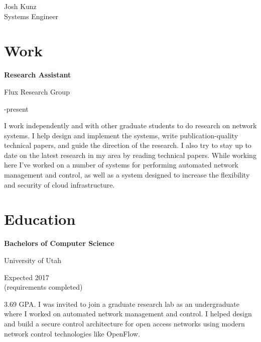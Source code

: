 \documentclass[10pt]{article}
\newcommand{\triline}[3]{%
    \parbox[t][][t]{.4\linewidth}{ #1 }%
    \parbox[t][][t]{.4\linewidth}{ #2 }%
    \parbox[t][][t]{.2\linewidth}{\raggedleft #3 }%
    \vspace{1ex}
}
\begin{document}
\titlespacing*{\section}{0pt}{1ex}{2ex}

\begin{center}
{ \fontsize{0.6in}{0in}\selectfont Josh Kunz } \\
\vspace{1ex}
{\large Systems Engineer } \\
\vspace{1ex}
\end{center}

\section{Work}

\triline{\bf Research Assistant}{Flux Research Group}{2014-present}

I work independently and with other graduate students to do research on network
systems. I help design and implement the systems, write publication-quality
technical papers, and guide the direction of the research. I also try to stay up
to date on the latest research in my area by reading technical papers.
While working here I've worked on a number of systems for performing automated
network management and control, as well as a system designed to increase the 
flexibility and security of cloud infrastructure.

\section{Education}

\triline{\bf Bachelors of Computer Science}%
{University of Utah}%
{Expected 2017 \\ \scriptsize (requirements completed) }

3.69 GPA. I was invited to join a graduate research lab as an undergraduate
where I worked on automated network management and control. I helped design
and build a secure control architecture for open access networks using modern
network control technologies like OpenFlow.
\end{document}
